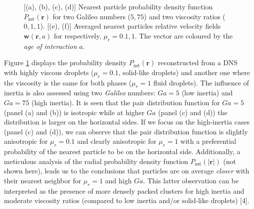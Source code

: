 \documentclass[9pt,a4paper]{article}
\begin{document}
\begin{figure}
    \caption{[(a), (b), (c), (d)] Nearest particle probability density function $P_\text{nst}(\textbf{r})$ for two Galileo numbers ($5,75$) and two viscosity ratios ($0,1,1$).
    [(e), (f)] Averaged nearest particles relative velocity fields $\textbf{w}(\textbf{r},a)$ for respectively, $\mu_r = 0.1, 1$. The vector are coloured by the \textit{age of interaction} $a$. 
     }
    \label{fig:icmf}
\end{figure}
Figure \ref{fig:icmf} displays the probability density $P_\text{nst}(\textbf{r})$ reconstructed from a DNS with highly viscous droplets ($\mu_r=0.1$, solid-like droplets) and another one where the viscosity is the same for both phases ($\mu_r=1$ fluid droplets). The influence of inertia is also assessed using two \textit{Galileo} numbers: $Ga=5$ (low inertia) and $Ga=75$ (high inertia). 
It is seen that the pair distribution function for $Ga = 5$ (panel (a) and (b)) is isotropic while at higher $Ga$ (panel (c) and (d)) the distribution is larger on the horizontal sides. 
If we focus on the high-inertia cases (panel (c) and (d)), we can observe that the pair distribution function is slightly anisotropic for $\mu_r = 0.1$ and clearly anisotropic for $\mu_r = 1$ with a preferential probability of the nearest particle to be on the horizontal side. 
Additionally, a meticulous analysis of the radial probability density function $P_\text{nst}(|\textbf{r}|)$ (not shown here), leads us to the conclusions that particles are on average \textit{closer} with their nearest neighbor for $\mu_r =1$ and high $Ga$. 
This latter observation can be interpreted as the presence of more densely packed clusters for high inertia and moderate viscosity ratios (compared to low inertia and/or solid-like droplets) [4]. 
\end{document}

